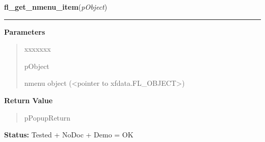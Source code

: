 \hspace{.8\funcindent}\begin{boxedminipage}{\funcwidth}

    \raggedright \textbf{fl\_get\_nmenu\_item}(\textit{pObject})

    \vspace{-1.5ex}

    \rule{\textwidth}{0.5\fboxrule}
\setlength{\parskip}{2ex}
\setlength{\parskip}{1ex}
      \textbf{Parameters}
      \vspace{-1ex}

      \begin{quote}
        \begin{Ventry}{xxxxxxx}

          \item[pObject]

          nmenu object ({\textless}pointer to 
          xfdata.FL\_OBJECT{\textgreater})

        \end{Ventry}

      \end{quote}

      \textbf{Return Value}
    \vspace{-1ex}

      \begin{quote}
      pPopupReturn

      \end{quote}

\textbf{Status:} Tested + NoDoc + Demo = OK



    \end{boxedminipage}

    \label{xformslib:library:fl_get_nmenu_item_by_value}

    \vspace{0.5ex}

